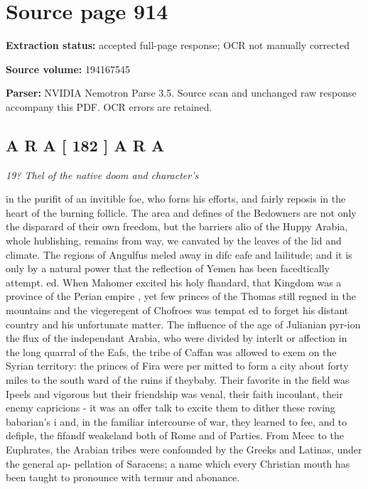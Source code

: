 \clearpage
\section{Source page 914}
\textbf{Extraction status:} accepted full-page response; OCR not manually corrected\par
\textbf{Source volume:} 194167545\par
\textbf{Parser:} NVIDIA Nemotron Parse 3.5. Source scan and unchanged raw response accompany this PDF. OCR errors are retained.\par\medskip
\subsection*{A R A  [ 182 ] A R A}
{\small\itshape 19? Thel of the native doom and character’s\par}\medskip
in the purifit of an invitible foe, who forns his efforts, and fairly reposis in the heart of the burning follicle. The area and defines of the Bedowners are not only the disparard of their own freedom, but the barriers alio of the Huppy Arabia, whole hublishing, remains from way, we canvated by the leaves of the lid and climate. The regions of Angulfus meled away in difc eafe and lailitude; and it is only by a natural power that the reflection of Yemen has been facedtically attempt. ed. When Mahomer excited his holy fhandard, that Kingdom was a province of the Perian empire , yet few princes of the Thomas still regned in the mountains and the viegeregent of Chofroes was tempat ed to forget his distant country and his unfortunate matter. The influence of the age of Julianian pyr-ion the flux of the independant Arabia, who were divided by interlt or affection in the long quarral of the Eafs, the tribe of Caffan was allowed to exem on the Syrian territory: the princes of Fira were per mitted to form a city about forty miles to the south ward of the ruins if theybaby. Their favorite in the field was Ipeels and vigorous but their friendship was venal, their faith incoulant, their enemy capricions - it was an offer talk to excite them to dither these roving babarian's i and, in the familiar intercourse of war, they learned to fee, and to defiple, the fifandf weakeland both of Rome and of Parties. From Meec to the Euphrates, the Arabian tribes were confounded by the Greeks and Latinas, under the general ap- pellation of Saracens; a name which every Christian mouth has been taught to pronounce with termur and abonance.\par\medskip
